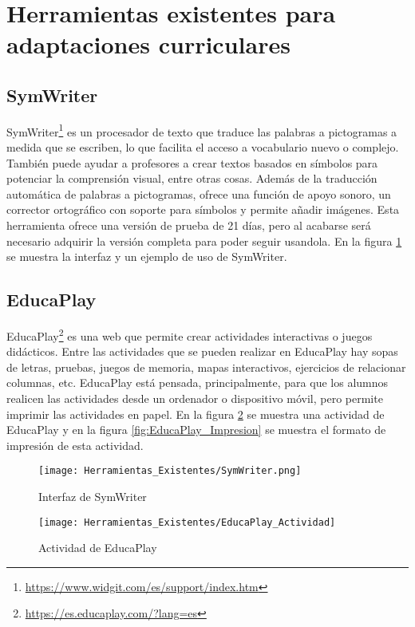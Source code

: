 \section{Herramientas existentes para adaptaciones curriculares}
\label{cap:herramientas} 
\subsection{SymWriter}
SymWriter\footnote{\url{https://www.widgit.com/es/support/index.htm}} es un procesador de texto que traduce las palabras a pictogramas a medida que se escriben, lo que facilita el acceso a vocabulario nuevo o complejo. También puede ayudar a profesores a crear textos basados en símbolos para potenciar la comprensión visual, entre otras cosas. Además de la traducción automática de palabras a pictogramas, ofrece una función de apoyo sonoro, un corrector ortográfico con soporte para símbolos y permite añadir imágenes. Esta herramienta ofrece una versión de prueba de 21 días, pero al acabarse será necesario adquirir la versión completa para poder seguir usandola. En la figura \ref{fig:SymWriter} se muestra la interfaz y un ejemplo de uso de SymWriter.

\subsection{EducaPlay}
EducaPlay\footnote{\url{https://es.educaplay.com/?lang=es}} es una web que permite crear actividades interactivas o juegos didácticos. Entre las actividades que se pueden realizar en EducaPlay hay sopas de letras, pruebas, juegos de memoria, mapas interactivos, ejercicios de relacionar columnas, etc. EducaPlay está pensada, principalmente, para que los alumnos realicen las actividades desde un ordenador o dispositivo móvil, pero permite imprimir las actividades en papel. En la figura \ref{fig:EducaPlay_Actividad} se muestra una actividad de EducaPlay y en la figura \ref{fig:EducaPlay_Impresion} se
muestra el formato de impresión de esta actividad.

\begin{figure}[h!]
    \centering
    \texttt{[image: Herramientas\_Existentes/SymWriter.png]}
    \caption{Interfaz de SymWriter}
    \label{fig:SymWriter}
\end{figure}

\begin{figure}[h!]
    \centering
    \texttt{[image: Herramientas\_Existentes/EducaPlay\_Actividad]}
    \caption{Actividad de EducaPlay}
    \label{fig:EducaPlay_Actividad}
\end{figure}

